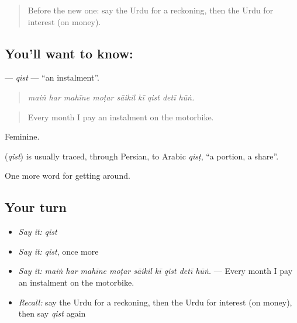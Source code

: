 \begin{quote}
Before the new one: say the Urdu for a reckoning, then the Urdu for interest (on money).
\end{quote}

\subsection*{You'll want to know: }
\textbf{} — \emph{qist} — \textquotedblleft{}an instalment\textquotedblright{}.

\begin{quote}
        
\end{quote}

\begin{quote}
\emph{maiṅ har mahīne moṭar sāikil kī qist detī hūṅ.}
\end{quote}

\begin{quote}
Every month I pay an instalment on the motorbike.
\end{quote}

Feminine.

\begin{cousinweb}
\textbf{} (\emph{qist}) is usually traced, through Persian, to Arabic \emph{qisṭ}, \textquotedblleft{}a portion, a share\textquotedblright{}.
\end{cousinweb}

\begin{grammarlens}[title={What you've built}]
One more word for getting around.
\end{grammarlens}

\subsection*{Your turn}
\begin{itemize}
\raggedright
  \item \emph{Say it:} \emph{qist}
  \item \emph{Say it:} \emph{qist}, once more
  \item \emph{Say it:} \emph{maiṅ har mahīne moṭar sāikil kī qist detī hūṅ.} — Every month I pay an instalment on the motorbike.
  \item \emph{Recall:} say the Urdu for a reckoning, then the Urdu for interest (on money), then say \emph{qist} again
\end{itemize}

